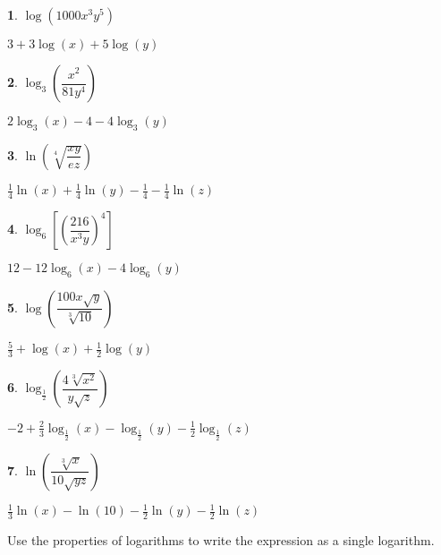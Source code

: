 \documentclass{amsbook}
\newtheorem{exc}{}
\newenvironment{ex}{\begin{exc}\normalfont}{\end{exc}}
\numberwithin{section}{chapter}
\numberwithin{equation}{chapter}
\begin{document}
\begin{multicols}{2}
\begin{ex}
	$\log\left(1000x^3y^5\right)$
	\begin{sol}
		$3 + 3\log(x) + 5 \log(y)$
	\end{sol}
\end{ex}


\begin{ex}
	$\log_{3} \left(\dfrac{x^2}{81y^4}\right)$
	\begin{sol}
	$2\log_{3}(x) - 4 - 4\log_{3}(y)$	
	\end{sol}
\end{ex}

\begin{ex}
	$\ln\left(\sqrt[4]{\dfrac{xy}{ez}}\right)$
	\begin{sol}
		$\frac{1}{4} \ln(x) + \frac{1}{4} \ln(y) - \frac{1}{4} - \frac{1}{4} \ln(z)$
	\end{sol}
\end{ex}

\begin{ex}
	$\log_{6} \left[ \left(\dfrac{216}{x^3y}\right)^4 \right]$
	\begin{sol}
	 $12-12\log_{6}(x) - 4\log_{6}(y)$	
	\end{sol}
\end{ex}


\begin{ex}
	$\log\left(\dfrac{100x\sqrt{y}}{\sqrt[3]{10}}\right)$
	\begin{sol}
		$\frac{5}{3}+\log(x)+\frac{1}{2}\log(y)$
	\end{sol}
\end{ex}


\begin{ex}
	$\log_{\frac{1}{2}}\left(\dfrac{4\sqrt[3]{x^2}}{y\sqrt{z}}\right)$
	\begin{sol}
		$-2+\frac{2}{3}\log_{\frac{1}{2}}(x)-\log_{\frac{1}{2}}(y)-\frac{1}{2}\log_{\frac{1}{2}}(z)$
	\end{sol}
\end{ex}


\begin{ex}
	$\ln \left(\dfrac{\sqrt[3]{x}}{10 \sqrt{yz}}\right)$
	\begin{sol}
		$\frac{1}{3} \ln(x) - \ln(10) - \frac{1}{2}\ln(y)-\frac{1}{2}\ln(z)$
	\end{sol}
\end{ex}

\end{multicols}

Use the properties of logarithms to write the expression as a single logarithm.
\end{document}
